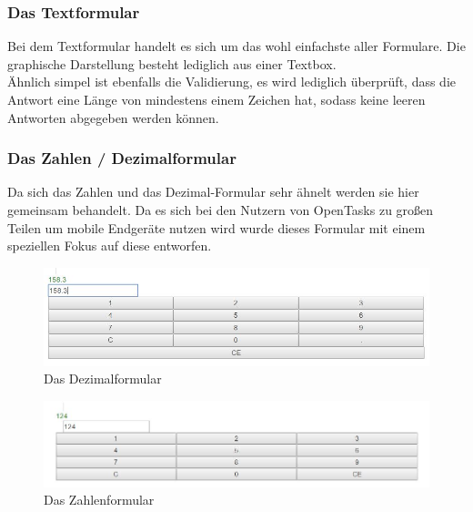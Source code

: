 \subsubsection{Das Textformular}

Bei dem Textformular handelt es sich um das wohl einfachste aller Formulare. Die graphische Darstellung besteht lediglich aus einer Textbox. \\
Ähnlich simpel ist ebenfalls die Validierung, es wird lediglich überprüft, dass die Antwort eine Länge von mindestens einem Zeichen hat, sodass keine leeren Antworten abgegeben werden können.

\subsubsection{Das Zahlen / Dezimalformular}

Da sich das Zahlen und das Dezimal-Formular sehr ähnelt werden sie hier gemeinsam behandelt. Da es sich bei den Nutzern von OpenTasks zu großen Teilen um mobile Endgeräte nutzen wird wurde dieses Formular mit einem speziellen Fokus auf diese entworfen.

\begin{figure}[htp]     %
\centering
\includegraphics[width=1\textwidth]{bilder/DezimalForm} 
\caption[Das Dezimalformular]{Das Dezimalformular}
\end{figure} 

\begin{figure}[htp]     %
\centering
\includegraphics[width=1\textwidth]{bilder/NumberForm} 
\caption[Das Zahlenformular]{Das Zahlenformular}
\end{figure} 


